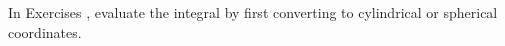 {\noindent In Exercises} 
{,  evaluate the integral by first converting to cylindrical or spherical coordinates.
}

